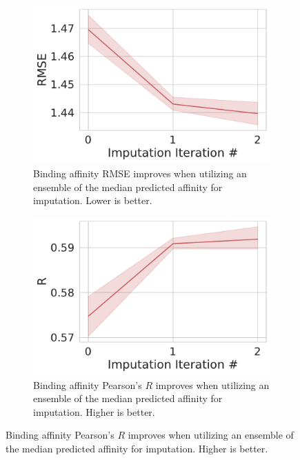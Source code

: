 \documentclass[journal=jcim,manuscript=article]{achemso}
\begin{document}
\begin{figure}[tbph]
    \centering
    \begin{subfigure}[t]{0.48\textwidth}
        \centering
        \includegraphics[width=\linewidth]{figures/MedGOEnsRMSE.pdf}
        \caption{Binding affinity RMSE improves when utilizing an ensemble of the median predicted affinity for imputation. Lower is better.}
    \end{subfigure}
    \hfill
    \begin{subfigure}[t]{0.48\textwidth}
        \centering
        \includegraphics[width=\linewidth]{figures/MedGOEnsR.pdf}
        \caption{Binding affinity Pearson's $R$ improves when utilizing an ensemble of the median predicted affinity for imputation. Higher is better.}
    \end{subfigure}


\end{figure}
\end{document}
